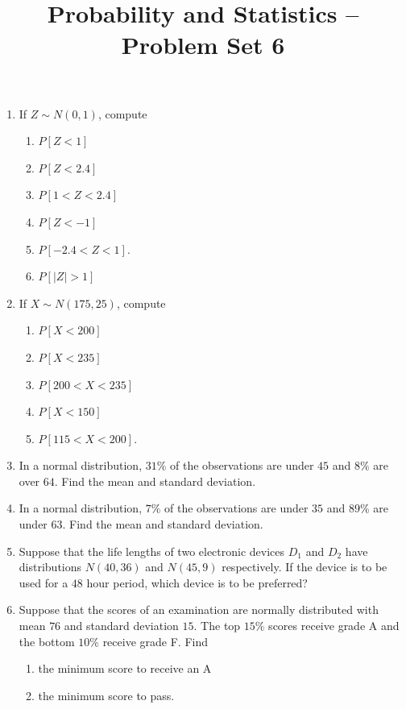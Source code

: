 \documentclass[svgnames]{amsart}
\title[]{Probability and Statistics -- Problem Set 6}
\begin{document}
\maketitle
\begin{enumerate}[leftmargin=*]
\item If $Z \sim N(0,1)$, compute
\begin{enumerate}
	\item $P[Z < 1]$
	\item $P[Z < 2.4]$
	\item $P[1 < Z < 2.4]$
	\item $P[Z < -1]$
	\item $P[-2.4 < Z < 1]$.
	\item $P[|Z| > 1]$
\end{enumerate}

\item If $X \sim N(175, 25)$, compute
\begin{enumerate}
	\item $P[X < 200]$
	\item $P[X < 235]$
	\item $P[200 < X < 235]$
	\item $P[X < 150]$
	\item $P[115 < X < 200]$.
\end{enumerate}

\item In a normal distribution, $31\%$ of the observations are under $45$ and $8\%$ are over $64$. Find the mean and standard deviation.

\item In a normal distribution, $7\%$ of the observations are under $35$ and $89\%$ are under $63$. Find the mean and standard deviation.

\item Suppose that the life lengths of two electronic devices $D_1$ and $D_2$ have distributions $N(40, 36)$ and $N(45, 9)$ respectively. If the device is to be used for a $48$ hour period, which device is to be preferred?

\item Suppose that the scores of an examination are normally distributed with mean $76$ and standard deviation $15$. The top $15\%$ scores receive grade A and the bottom $10\%$ receive grade F. Find
\begin{enumerate}
	\item the minimum score to receive an A
	\item the minimum score to pass.
\end{enumerate}


\end{enumerate}
\end{document}

